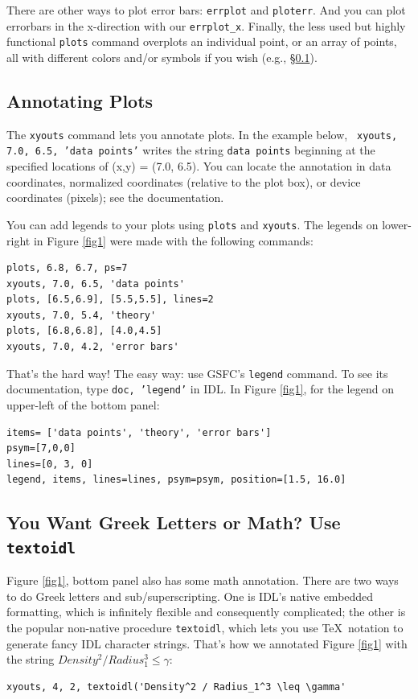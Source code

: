 \documentclass[psfig,preprint]{aastex}
\begin{document}

\noindent There are other ways to plot error bars: {\tt errplot} and
          {\tt ploterr}. And you can plot errorbars in the x-direction
          with our {\tt errplot\_x}. Finally, the less used but highly
          functional {\tt plots} command overplots an individual point,
          or an array of points, all with different colors and/or
          symbols if you wish (e.g., \S \ref{annotating}).

\subsection{Annotating Plots} \label{annotating}

The {\tt xyouts} command lets you annotate plots. In the example below, {\tt
xyouts, 7.0, 6.5, 'data points'} writes the string {\tt data points}
beginning at the specified locations of (x,y) = (7.0, 6.5). You can
locate the annotation in data coordinates, normalized coordinates
(relative to the plot box), or device coordinates (pixels); see the
documentation. 

You can add legends to your plots using {\tt plots} and {\tt xyouts}.
The legends on lower-right in Figure \ref{fig1} were made with the
following commands:

\begin{verbatim}
plots, 6.8, 6.7, ps=7
xyouts, 7.0, 6.5, 'data points'
plots, [6.5,6.9], [5.5,5.5], lines=2
xyouts, 7.0, 5.4, 'theory'
plots, [6.8,6.8], [4.0,4.5]
xyouts, 7.0, 4.2, 'error bars'
\end{verbatim}

That's the hard way!  The easy way: use GSFC's {\tt legend} command. To
see its documentation, type {\tt doc, 'legend'} in IDL. In Figure
\ref{fig1}, for the legend on upper-left of the bottom panel:

\begin{verbatim}
items= ['data points', 'theory', 'error bars']
psym=[7,0,0]
lines=[0, 3, 0]
legend, items, lines=lines, psym=psym, position=[1.5, 16.0]
\end{verbatim}

\subsection{You Want Greek Letters or Math? Use {\tt textoidl}}

Figure \ref{fig1}, bottom panel also has some math annotation. There are
two ways to do Greek letters and sub/superscripting.  One is IDL's
native embedded formatting, which is infinitely flexible and
consequently complicated; the other is the popular non-native procedure
{\tt textoidl}, which lets you use \TeX\ notation to generate fancy IDL
character strings.  That's how we annotated Figure \ref{fig1} with the
string $Density^2 / Radius_1^3 \leq \gamma$:
\begin{verbatim}
xyouts, 4, 2, textoidl('Density^2 / Radius_1^3 \leq \gamma'
\end{verbatim}
\end{document}

